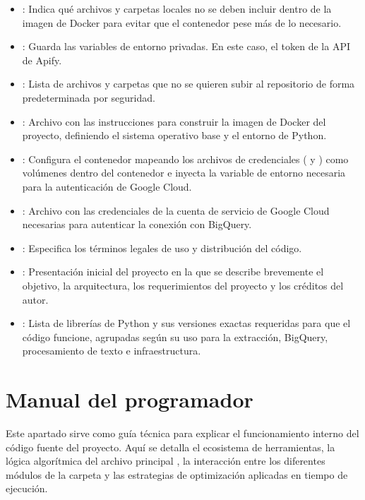\begin{itemize}
    \item {}: Indica qué archivos y carpetas locales no se deben incluir dentro de la imagen de Docker para evitar que el contenedor pese más de lo necesario.
    \item {}: Guarda las variables de entorno privadas. En este caso, el token de la API de Apify.
    \item {}: Lista de archivos y carpetas que no se quieren subir al repositorio de forma predeterminada por seguridad.
    \item {}: Archivo con las instrucciones para construir la imagen de Docker del proyecto, definiendo el sistema operativo base y el entorno de Python.
    \item {}: Configura el contenedor mapeando los archivos de credenciales ( y ) como volúmenes dentro del contenedor e inyecta la variable de entorno necesaria para la autenticación de Google Cloud.
    \item {}: Archivo con las credenciales de la cuenta de servicio de Google Cloud necesarias para autenticar la conexión con BigQuery.
    \item {}: Especifica los términos legales de uso y distribución del código.
    \item {}: Presentación inicial del proyecto en la que se describe brevemente el objetivo, la arquitectura,  los requerimientos del proyecto y los créditos del autor.
    \item {}: Lista de librerías de Python y sus versiones exactas requeridas para que el código funcione, agrupadas según su uso para la extracción, BigQuery, procesamiento de texto e infraestructura.
\end{itemize}


\section{Manual del programador}
Este apartado sirve como guía técnica para explicar el funcionamiento interno del código fuente del proyecto. Aquí se detalla el ecosistema de herramientas, la lógica algorítmica del archivo principal , la interacción entre los diferentes módulos de la carpeta  y las estrategias de optimización aplicadas en tiempo de ejecución.

